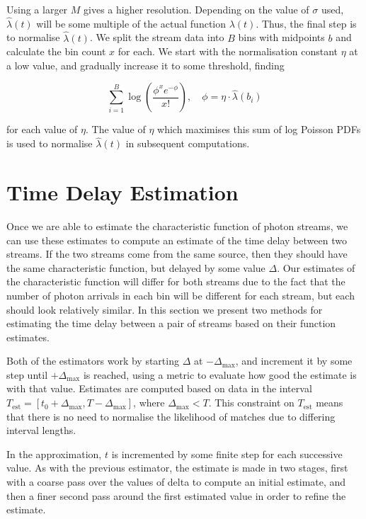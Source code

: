 \documentclass[a4paper,11pt]{article}
\begin{document}
   Using a larger $M$ gives a higher resolution. Depending on the value of
   $\sigma$ used, $\hat{\lambda}(t)$ will be some multiple of the actual
   function $\lambda(t)$. Thus, the final step is to normalise
   $\hat{\lambda}(t)$. We split the stream data into $B$ bins with midpoints $b$
   and calculate the bin count $x$ for each. We start with the normalisation
   constant $\eta$ at a low value, and gradually increase it to some threshold,
   finding

   \begin{equation}\label{eq:normcalc}
   \sum_{i=1}^B
   \log\left(\frac{\phi^xe^{-\phi}}{x!}\right), \quad \phi=\eta\cdot\hat{\lambda}(b_i)
   \end{equation}

   for each value of $\eta$. The value of $\eta$ which maximises this sum of log
   Poisson PDFs is used to normalise $\hat{\lambda}(t)$ in subsequent
   computations.
\section{Time Delay Estimation}
\label{sec-4}

  Once we are able to estimate the characteristic function of photon streams, we
  can use these estimates to compute an estimate of the time delay between two
  streams. If the two streams come from the same source, then they should have
  the same characteristic function, but delayed by some value $\Delta$. Our
  estimates of the characteristic function will differ for both streams due to
  the fact that the number of photon arrivals in each bin will be different for
  each stream, but each should look relatively similar. In this section we
  present two methods for estimating the time delay between a pair of streams
  based on their function estimates.

  Both of the estimators work by starting $\Delta$ at $-\Delta_{\text{max}}$,
  and increment it by some step until $+\Delta_{\text{max}}$ is reached, using a
  metric to evaluate how good the estimate is with that value. Estimates are
  computed based on data in the interval
  $T_{\text{est}}=[t_0+\Delta_{\text{max}}, T-\Delta_{\text{max}}]$, where
  $\Delta_{\text{max}}<T$. This constraint on $T_{\text{est}}$ means that there
  is no need to normalise the likelihood of matches due to differing interval
  lengths.

  In the approximation, $t$ is incremented by some finite step for each
  successive value. As with the previous estimator, the estimate is made in two
  stages, first with a coarse pass over the values of delta to compute an
  initial estimate, and then a finer second pass around the first estimated
  value in order to refine the estimate.
\end{document}
